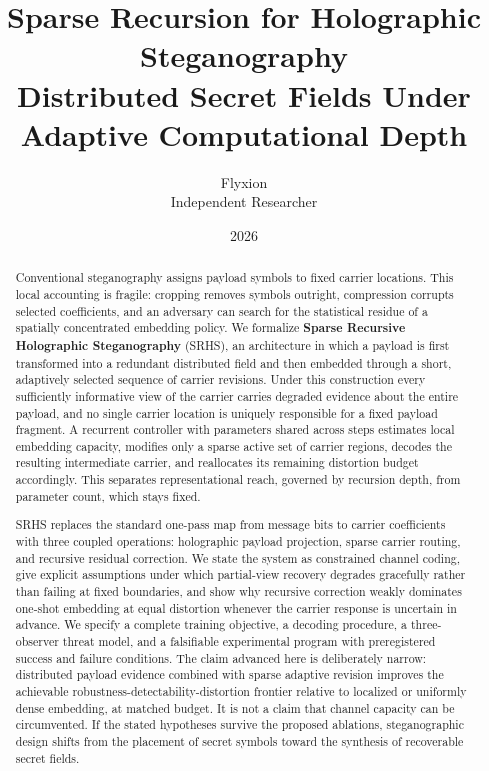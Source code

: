 \documentclass[11pt]{article}
\title{\textbf{Sparse Recursion for Holographic Steganography}\\[0.3em]
\large Distributed Secret Fields Under Adaptive Computational Depth}
\author{Flyxion \\ Independent Researcher}
\date{2026}
\begin{document}
\maketitle

\begin{abstract}
Conventional steganography assigns payload symbols to fixed carrier locations. This local accounting is fragile: cropping removes symbols outright, compression corrupts selected coefficients, and an adversary can search for the statistical residue of a spatially concentrated embedding policy. We formalize \textbf{Sparse Recursive Holographic Steganography} (SRHS), an architecture in which a payload is first transformed into a redundant distributed field and then embedded through a short, adaptively selected sequence of carrier revisions. Under this construction every sufficiently informative view of the carrier carries degraded evidence about the entire payload, and no single carrier location is uniquely responsible for a fixed payload fragment. A recurrent controller with parameters shared across steps estimates local embedding capacity, modifies only a sparse active set of carrier regions, decodes the resulting intermediate carrier, and reallocates its remaining distortion budget accordingly. This separates representational reach, governed by recursion depth, from parameter count, which stays fixed.

SRHS replaces the standard one-pass map from message bits to carrier coefficients with three coupled operations: holographic payload projection, sparse carrier routing, and recursive residual correction. We state the system as constrained channel coding, give explicit assumptions under which partial-view recovery degrades gracefully rather than failing at fixed boundaries, and show why recursive correction weakly dominates one-shot embedding at equal distortion whenever the carrier response is uncertain in advance. We specify a complete training objective, a decoding procedure, a three-observer threat model, and a falsifiable experimental program with preregistered success and failure conditions. The claim advanced here is deliberately narrow: distributed payload evidence combined with sparse adaptive revision improves the achievable robustness-detectability-distortion frontier relative to localized or uniformly dense embedding, at matched budget. It is not a claim that channel capacity can be circumvented. If the stated hypotheses survive the proposed ablations, steganographic design shifts from the placement of secret symbols toward the synthesis of recoverable secret fields.
\end{abstract}
\end{document}
